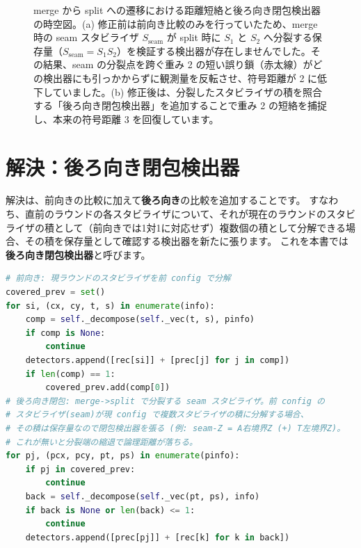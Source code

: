 \begin{figure}[htbp]
  \caption{merge から split への遷移における距離短絡と後ろ向き閉包検出器の時空図。(a) 修正前は前向き比較のみを行っていたため、merge 時の seam スタビライザ $S_{\mathrm{seam}}$ が split 時に $S_1$ と $S_2$ へ分裂する保存量（$S_{\mathrm{seam}} = S_1 S_2$）を検証する検出器が存在しませんでした。その結果、seam の分裂点を跨ぐ重み 2 の短い誤り鎖（赤太線）がどの検出器にも引っかからずに観測量を反転させ、符号距離が 2 に低下していました。(b) 修正後は、分裂したスタビライザの積を照合する「後ろ向き閉包検出器」を追加することで重み 2 の短絡を捕捉し、本来の符号距離 3 を回復しています。}
  \label{fig:ch17_distance_shortcut}
\end{figure}


\section{解決：後ろ向き閉包検出器}\label{sec:fix}

解決は、前向きの比較に加えて\textbf{後ろ向き}の比較を追加することです。
すなわち、直前のラウンドの各スタビライザについて、それが現在のラウンドのスタビライザの積として（前向きでは1対1に対応せず）複数個の積として分解できる場合、その積を保存量として確認する検出器を新たに張ります。
これを本書では\textbf{後ろ向き閉包検出器}と呼びます。

\begin{lstlisting}[language=Python, caption={前向き比較と後ろ向き閉包検出器（src/stages/02\_circuit\_level/src/ftqc/ls\_cnot\_ft.py, LSCnotFT.build 内）}]
# 前向き: 現ラウンドのスタビライザを前 config で分解
covered_prev = set()
for si, (cx, cy, t, s) in enumerate(info):
    comp = self._decompose(self._vec(t, s), pinfo)
    if comp is None:
        continue
    detectors.append([rec[si]] + [prec[j] for j in comp])
    if len(comp) == 1:
        covered_prev.add(comp[0])
# 後ろ向き閉包: merge->split で分裂する seam スタビライザ。前 config の
# スタビライザ(seam)が現 config で複数スタビライザの積に分解する場合、
# その積は保存量なので閉包検出器を張る (例: seam-Z = A右境界Z (+) T左境界Z)。
# これが無いと分裂端の縮退で論理距離が落ちる。
for pj, (pcx, pcy, pt, ps) in enumerate(pinfo):
    if pj in covered_prev:
        continue
    back = self._decompose(self._vec(pt, ps), info)
    if back is None or len(back) <= 1:
        continue
    detectors.append([prec[pj]] + [rec[k] for k in back])
\end{lstlisting}

